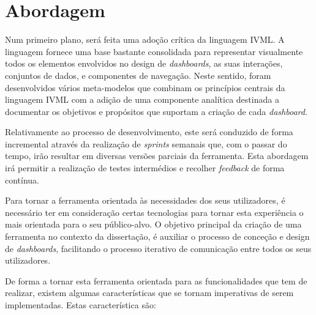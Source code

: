 
\section{Abordagem} %
\label{sec:dashboard_abordagem}

Num primeiro plano, será feita uma adoção crítica da linguagem \gls{IVML}. A linguagem fornece uma base bastante consolidada para representar visualmente todos os elementos envolvidos no design de \textit{dashboards}, as suas interações, conjuntos de dados, e componentes de navegação. Neste sentido, foram desenvolvidos vários meta-modelos que combinam os princípios centrais da linguagem \gls{IVML} com a adição de uma componente analítica destinada a documentar os objetivos e propósitos que suportam a criação de cada \textit{dashboard}.

Relativamente ao processo de desenvolvimento, este será conduzido de forma incremental através da realização de \textit{sprints} semanais que, com o passar do tempo, irão resultar em diversas versões parciais da ferramenta. Esta abordagem irá permitir a realização de testes intermédios e recolher \textit{feedback} de forma contínua.

Para tornar a ferramenta orientada às necessidades dos seus utilizadores, é necessário ter em consideração certas tecnologias para tornar esta experiência o mais orientada para o seu público-alvo. O objetivo principal da criação de uma ferramenta no contexto da dissertação, é auxiliar o processo de conceção e design de \textit{dashboards}, facilitando o processo iterativo de comunicação entre todos os seus utilizadores.

De forma a tornar esta ferramenta orientada para as funcionalidades que tem de realizar, existem algumas características que se tornam imperativas de serem implementadas. Estas característica são:

